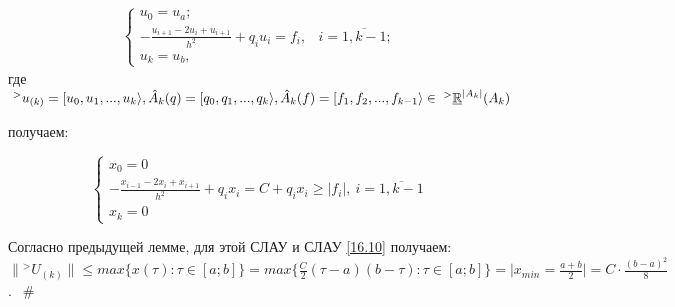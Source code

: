 \documentclass[__main__.tex]{subfiles}
\begin{document}
\begin{gather}
	\begin{cases}
		u_0 = u_a;\\
		-\frac{u_{i+1}-2u_i+u_{i+1}}{h^2} + q_iu_i = f_i, & i=\overline{1,k-1};\\
		u_k=u_b,
	\end{cases}
\end{gather}	
где $\;^>u_{(k)} = [u_0,u_1,...,u_k\rangle, \hat{A}_k(q) = [q_0,q_1,...,q_k\rangle,\\
\hat{A}_k(f) = [f_1, f_2,...,f_{k-1}\rangle \in \;^>\underline{\mathbb{R}}^{|A_k|}(A_k)$

получаем:

$$
\begin{cases}
x_0 = 0 \\
-\frac{x_{i-1} - 2 x_i + x_{i+1}}{h^2} + q_i x_i = C + q_i x_i \geq \left|f_i\right|, \ i = \overline{1,k-1} \\
x_k = 0
\end{cases}
$$

Согласно предыдущей лемме, для этой СЛАУ и СЛАУ \ref{16.10} получаем: $\| {}^> U_{\left(k\right)} \| \leq max \{ x \left(\tau\right): \tau \in [a;b]\} = max \{\frac{C}{2}\left(\tau - a\right) \left(b- \tau\right): \tau \in [a;b] \} = \big| x_{min} = \frac{a+b}{2} \big| = C \cdot \frac{\left(b-a\right)^2}{8}$. $\ \ \#$
\end{document}
